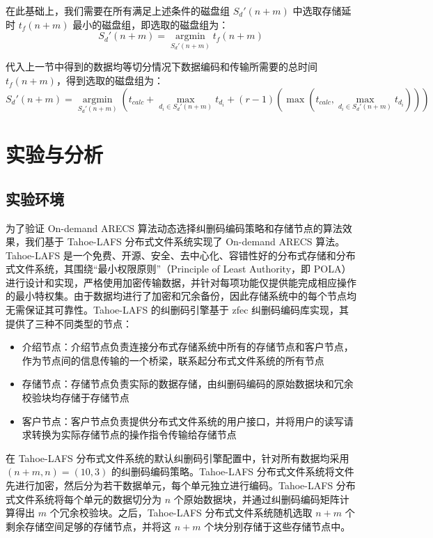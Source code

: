 在此基础上，我们需要在所有满足上述条件的磁盘组 $S_{d}'(n+m)$ 中选取存储延时 $t_{f}(n+m)$ 最小的磁盘组，即选取的磁盘组为：
\begin{equation}
S_{d}'(n+m)=\operatorname*{argmin}_{S_{d}'(n+m)}{t_{f}(n+m)}
\end{equation}

代入上一节中得到的数据均等切分情况下数据编码和传输所需要的总时间 $t_{f}(n+m)$，得到选取的磁盘组为：
\begin{equation}
S_{d}'(n+m)=\operatorname*{argmin}_{S_{d}'(n+m)}\left(t_{calc}+\max_{d_{i}{\in}S_{d}'(n+m)}t_{d_i}+(r-1)\left(\max\left(t_{calc},\max_{d_{i}{\in}S_{d}'(n+m)}t_{d_i}\right)\right)\right)
\end{equation}
\section{实验与分析}
\subsection{实验环境}
为了验证 On-demand ARECS 算法动态选择纠删码编码策略和存储节点的算法效果，我们基于 Tahoe-LAFS 分布式文件系统\cite{wilcox2008tahoe}实现了 On-demand ARECS 算法。Tahoe-LAFS 是一个免费、开源、安全、去中心化、容错性好的分布式存储和分布式文件系统，其围绕“最小权限原则”（Principle of Least Authority，即 POLA）进行设计和实现，严格使用加密传输数据，并针对每项功能仅提供能完成相应操作的最小特权集。由于数据均进行了加密和冗余备份，因此存储系统中的每个节点均无需保证其可靠性。Tahoe-LAFS 的纠删码引擎基于 zfec 纠删码编码库实现，其提供了三种不同类型的节点：
\begin{itemize}
\item 介绍节点：介绍节点负责连接分布式存储系统中所有的存储节点和客户节点，作为节点间的信息传输的一个桥梁，联系起分布式文件系统的所有节点
\item 存储节点：存储节点负责实际的数据存储，由纠删码编码的原始数据块和冗余校验块均存储于存储节点
\item 客户节点：客户节点负责提供分布式文件系统的用户接口，并将用户的读写请求转换为实际存储节点的操作指令传输给存储节点
\end{itemize}

在 Tahoe-LAFS 分布式文件系统的默认纠删码引擎配置中，针对所有数据均采用 $(n+m,n)=(10,3)$ 的纠删码编码策略。Tahoe-LAFS 分布式文件系统将文件先进行加密，然后分为若干数据单元，每个单元独立进行编码。Tahoe-LAFS 分布式文件系统将每个单元的数据切分为 $n$ 个原始数据块，并通过纠删码编码矩阵计算得出 $m$ 个冗余校验块。之后，Tahoe-LAFS 分布式文件系统随机选取 $n+m$ 个剩余存储空间足够的存储节点，并将这 $n+m$ 个块分别存储于这些存储节点中。

